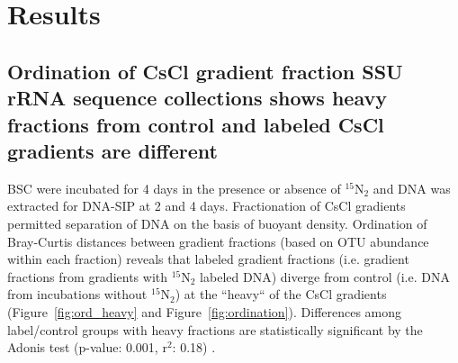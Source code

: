 \section{Results}
\subsection{Ordination of CsCl gradient fraction SSU rRNA sequence collections
shows heavy fractions from control and labeled CsCl gradients are
different} 
BSC were incubated for 4 days in the presence or absence of $^{15}$N$_{2}$ and
DNA was extracted for DNA-SIP at 2 and 4 days. Fractionation of CsCl gradients
permitted separation of DNA on the basis of buoyant density. Ordination of
Bray-Curtis \citep{Bray_1957} distances between gradient fractions (based on OTU
abundance within each fraction) reveals that labeled gradient fractions (i.e.
gradient fractions from gradients with $^{15}$N$_{2}$ labeled DNA) diverge from
control (i.e. DNA from incubations without $^{15}$N$_{2}$) at the ``heavy`` of
the CsCl gradients (Figure~\ref{fig:ord_heavy} and
Figure~\ref{fig:ordination}).  Differences among label/control groups with
heavy fractions are statistically significant by the Adonis test (p-value:
0.001, r$^{2}$: 0.18) \citep{Anderson_2001}. 
